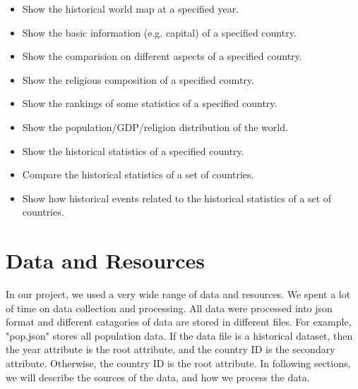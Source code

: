 \documentclass[12pt, fullpage,letterpaper]{article}
\begin{document}
\begin{itemize}

    \item Show the historical world map at a specified year.

    \item Show the basic information (e.g. capital) of a specified country.

    \item Show the comparision on different aspects of a specified country.

    \item Show the religious composition of a specified country.

    \item Show the rankings of some statistics of a specified country.

    \item Show the population/GDP/religion distribution of the world.

    \item Show the historical statistics of a specified country.

    \item Compare the historical statistics of a set of countries.

    \item Show how historical events related to the historical statistics of a set of countries.

\end{itemize}

\section{Data and Resources}
In our project, we used a very wide range of data and resources. We spent a lot of time on data collection and processing.
    All data were processed into json format and different catagories
    of data are stored in different files. For example, "pop.json" stores all population data.
    If the data file is a historical dataset, then the year attribute is the root attribute, and the country ID is the secondary attribute.
    Otherwise, the country ID is the root attribute.
In following sections, we will describe the sources of the data, and how we process the data.
\end{document}
